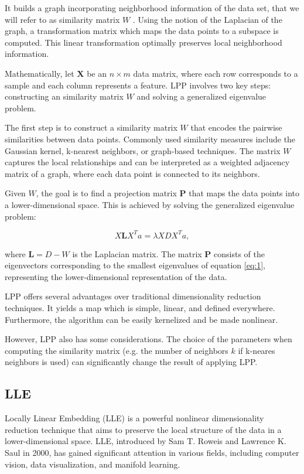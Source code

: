 It builds a graph incorporating neighborhood information
of the data set, that we will refer to as similarity matrix $W$ . Using the notion of the Laplacian of the graph, a transformation matrix which maps the data points to a subspace is computed. This linear transformation optimally preserves local neighborhood information.

Mathematically, let $\mathbf{X}$ be an $n \times m$ data matrix, where each row corresponds to a sample and each column represents a feature. LPP involves two key steps: constructing an similarity matrix $W$ and solving a generalized eigenvalue problem.

The first step is to construct a similarity matrix $W$ that encodes the pairwise similarities between data points. Commonly used similarity measures include the Gaussian kernel, k-nearest neighbors, or graph-based techniques. The matrix $W$ captures the local relationships and can be interpreted as a weighted adjacency matrix of a graph, where each data point is connected to its neighbors.

Given $W$, the goal is to find a projection matrix $\mathbf{P}$ that maps the data points into a lower-dimensional space. This is achieved by solving the generalized eigenvalue problem:

\begin{equation} \label{eq:1}
    X \mathbf{L} X^T a = \lambda XDX^Ta,
\end{equation}

where $\mathbf{L} = D-W$ is the Laplacian matrix. The matrix $\mathbf{P}$ consists of the eigenvectors corresponding to the smallest eigenvalues of equation \ref{eq:1}, representing the lower-dimensional representation of the data.

LPP offers several advantages over traditional dimensionality reduction techniques. It yields a map which is simple, linear, and defined everywhere. Furthermore, the algorithm can be easily kernelized and be made nonlinear.

However, LPP also has some considerations. The choice of the parameters when computing the similarity matrix (e.g. the number of neighbors $k$ if k-neares neighbors is used) can significantly change the result of applying LPP.

\subsection{LLE} %

Locally Linear Embedding (LLE) is a powerful nonlinear dimensionality reduction technique that aims to preserve the local structure of the data in a lower-dimensional space. LLE, introduced by Sam T. Roweis and Lawrence K. Saul in 2000, has gained significant attention in various fields, including computer vision, data visualization, and manifold learning.


